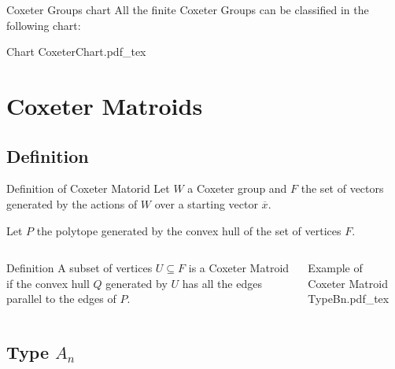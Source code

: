 \documentclass{beamer}
\newcommand{\incfig}[1]{%
\center
\def\svgwidth{0.9\columnwidth}
{#1.pdf_tex}
}
\begin{document}
\begin{frame}{Coxeter Groups chart}
  All the finite Coxeter Groups can be classified in the following chart:
 \begin{block}{Chart}
   \incfig{CoxeterChart}
 \end{block} 
\end{frame}

\section{Coxeter Matroids}
\subsection{Definition}
\begin{frame}{Definition of Coxeter Matorid}
  Let $W$ a Coxeter group and  $F$ the set of vectors generated by the actions of  $W$ over a starting vector  $\overline{x}$.

  Let $P$ the polytope generated by the convex hull of the set of vertices $F$.

\begin{columns}[c]
\begin{block}{Definition}
  A subset of vertices $U\subseteq F$ is a Coxeter Matroid if the convex hull $Q$ generated by $U$ has all the edges parallel to the edges of  $P$.
\end{block} 
\begin{block}{Example of Coxeter Matroid}
 \incfig{TypeBn} 
\end{block}
\end{columns}
\end{frame}




\subsection{Type $A_n$}
\end{document}

